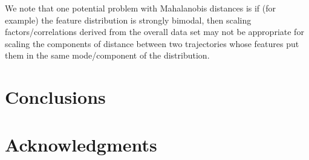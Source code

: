 \documentclass[fleqn,10pt,lineno]{wlpeerj}
\begin{document}
We note that one potential problem with Mahalanobis distances is if (for example) the feature distribution is strongly bimodal, then scaling factors/correlations derived from the overall data set may not be appropriate for scaling the components of distance between two trajectories whose features put them in the same mode/component of the distribution.

\section*{Conclusions}

\section*{Acknowledgments}


\end{document}
